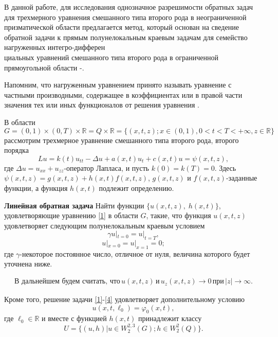 В данной работе, для исследования однозначное разрешимости обратных задач для трехмерного уравнения смешанного типа второго рода в неограниченной призматической области предлагается метод, который основан на сведение обратной задачи к прямым полунелокальным краевым задачам для  семейство нагруженных интегро-дифферен \\циальных уравнений смешанного типа второго рода в ограниченной прямоугольной области \cite{Dzhamalov1}-\cite{Dzhamalov3}.

Напомним, что нагруженным уравнением принято называть уравнение с частными производными, содержащее в коэффициентах или в правой части значения тех или иных функционалов от решения уравнения \cite{Nakhushev}.

В области
$$G=(0,1)\times (0,T)\times \mathbb{R}=Q\times \mathbb{R}=\{(x,t,z);x\in (0,1),0<t<T<+\infty , z\in \mathbb{R}\}$$
рассмотрим трехмерное уравнение смешанного типа второго рода, второго порядка
 \begin{equation}\label{1}
Lu=k(t)u_{tt}-\Delta u +a(x,t)u_{t}+ c(x,t)u=\psi (x,t,z),
 \end{equation}
где $\Delta u=u_{xx}+u_{zz}$-оператор Лапласа, и пусть  $k(0)=k(T)=0$. Здесь $\psi (x,t,z)=g(x,t,z)+h(x,t)f(x,t,z)$,  $g(x,t,z)$ и $f(x,t,z)$-заданные функции, а функция  $h(x,t)$ подлежит определению.

{\bf Линейная обратная задача} Найти функции $\{u(x,t,z),\; h(x,t)\}$, удовлетворяющие уравнению \eqref{1} в области $G$, такие, что функция $u(x,t,z)$  удовлетворяет следующим полунелокальным краевым условием
\begin{equation} \label{2}
\gamma u|_{t=0}= u|_{t=T},
\end{equation}
\begin{equation} \label{3}
u|_{x=0}=  u|_{x=1}=0;
\end{equation}
где $\gamma $-некоторое постоянное число, отличное от нуля,  величина которого будет уточнена ниже.

\begin{equation} \label{4}
\begin{array}{c}
\text{В дальнейшем будем считать, что}\, u(x,t,z)\, \text{и}\, u_{z}(x,t,z)\rightarrow 0 \,  \text{при} \, \left|z\right|\rightarrow \infty.
\end{array}
\end{equation}

Кроме того, решение задачи \eqref{1}-\eqref{4}  удовлетворяет дополнительному условию
\begin{equation} \label{5}
u(x,t,\ell_{0})=\varphi _{0}(x,t),
\end{equation}
где $\ell_{0}\in \mathbb{R}$ и вместе с функцией  $h(x,t)$ принадлежит классу
$$U=\{(u,h)|u\in W_{2}^{2,3}(G);h\in W_{2}^{2}(Q)\}.$$

